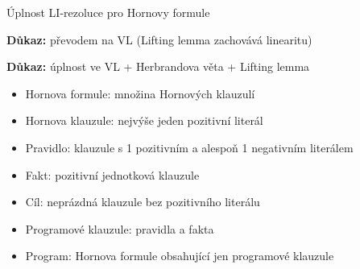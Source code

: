 \documentclass{beamer}
\begin{document}
\begin{frame}{Úplnost LI-rezoluce pro Hornovy formule}

    \medskip

    \pause

    \pause
    \textbf{Důkaz:} \pause převodem na VL (Lifting lemma zachovává linearitu) \hfill\qedsymbol

    \bigskip

    \pause
        
    \pause
    \textbf{Důkaz:} \pause úplnost ve VL + Herbrandova věta + Lifting lemma\hfill\qedsymbol

    \smallskip
    
    \pause
    \begin{itemize}[<+->]\small
        \item \alert{Hornova formule:} množina Hornových klauzulí
        \item \alert{Hornova klauzule:} nejvýše jeden pozitivní literál   
        \item \alert{Pravidlo:} klauzule s 1 pozitivním a alespoň 1 negativním literálem  
         
        \item \alert{Fakt:} pozitivní jednotková klauzule    
        \item \alert{Cíl:} neprázdná klauzule bez pozitivního literálu 
        \item \alert{Programové klauzule:} pravidla a fakta  
        \item \alert{Program}: Hornova formule obsahující jen programové klauzule
    \end{itemize}

\end{frame}
\end{document}
